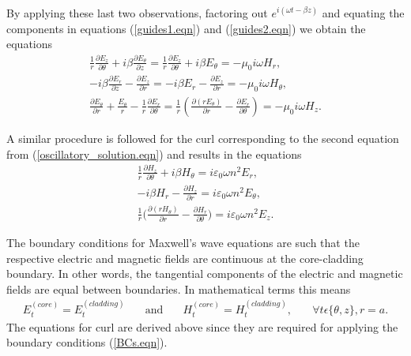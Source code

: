 \documentclass[12pt]{article}
\theoremstyle{definition}
\numberwithin{equation}{section}
\begin{document}
{By applying these last two observations, factoring out $e^{i(\omega t-\beta z)}$ and equating the components in equations (\ref{guides1.eqn}) and (\ref{guides2.eqn}) we obtain the equations
\begin{gather}
\frac{1}{r}\frac{\partial E_z}{\partial\theta}+i\beta\frac{\partial E_{\theta}}{\partial z}=\frac{1}{r}\frac{\partial E_z}{\partial\theta}+i\beta E_{\theta}=-\mu_{0} i\omega H_r,\nonumber\\
-i\beta\frac{\partial E_r}{\partial z}-\frac{\partial E_z}{\partial r}=-i\beta E_r -\frac{\partial E_z}{\partial r}=-\mu_{0} i\omega H_{\theta},\label{guides3.eqn}\\
\frac{\partial E_{\theta}}{\partial r}+\frac{E_{\theta}}{r}-\frac{1}{r}\frac{\partial E_r}{\partial\theta}= \frac{1}{r}\left(\frac{\partial (rE_{\theta})}{\partial r} -\frac{\partial E_r}{\partial\theta}\right)=-\mu_{0} i\omega H_z.\nonumber
\end{gather}

A similar procedure is followed for the curl corresponding to the second equation from (\ref{oscillatory_solution.eqn}) and results in the equations
\begin{gather}
\frac{1}{r}\frac{\partial H_z}{\partial\theta}+i\beta H_{\theta}=i\varepsilon_{0}\omega n^2 E_r,\nonumber\\
-i\beta H_r -\frac{\partial H_z}{\partial r}=i\varepsilon_{0}\omega n^2 E_{\theta},\label{guides4.eqn}\\
\frac{1}{r}\bigg(\frac{\partial (rH_{\theta})}{\partial r} -\frac{\partial H_r}{\partial\theta}\bigg)=i\varepsilon_{0}\omega n^2 E_z.\nonumber
\end{gather}

The boundary conditions for Maxwell's wave equations are such that the respective electric and magnetic fields are continuous at the core-cladding boundary. In other words, the tangential components of the electric and magnetic fields are equal between boundaries. In mathematical terms this means
\begin{equation}
\begin{array}{cccc}
E_{t}^{(core)}=E_{t}^{(cladding)}&\quad\mbox{and}&\quad H_{t}^{(core)}=H_{t}^{(cladding)},&\quad\forall t\epsilon\{\theta,z\},r=a.
\end{array}
\label{BCs.eqn}
\end{equation}
The equations for curl are derived above since they are required for applying the boundary conditions (\ref{BCs.eqn}).

}
\end{document}
